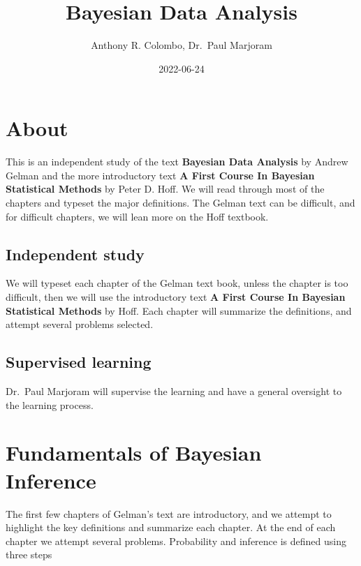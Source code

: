 \documentclass[
]{book}
\title{Bayesian Data Analysis}
\author{Anthony R. Colombo, Dr.~Paul Marjoram}
\date{2022-06-24}
\theoremstyle{definition}
\theoremstyle{definition}
\theoremstyle{definition}
\theoremstyle{definition}
\theoremstyle{remark}
\begin{document}
\maketitle

{
\setcounter{tocdepth}{1}
\tableofcontents
}
\hypertarget{about}{%
\chapter*{About}\label{about}}

This is an independent study of the text \textbf{Bayesian Data Analysis} by Andrew Gelman and the more introductory text \textbf{A First Course In Bayesian Statistical Methods} by Peter D. Hoff. We will read through most of the chapters and typeset the major definitions. The Gelman text can be difficult, and for difficult chapters, we will lean more on the Hoff textbook.

\hypertarget{independent-study}{%
\section*{Independent study}\label{independent-study}}

We will typeset each chapter of the Gelman text book, unless the chapter is too difficult, then we will use the introductory text \textbf{A First Course In Bayesian Statistical Methods} by Hoff. Each chapter will summarize the definitions, and attempt several problems selected.

\hypertarget{supervised-learning}{%
\section*{Supervised learning}\label{supervised-learning}}

Dr.~Paul Marjoram will supervise the learning and have a general oversight to the learning process.

\hypertarget{fundamentals-of-bayesian-inference}{%
\chapter{Fundamentals of Bayesian Inference}\label{fundamentals-of-bayesian-inference}}

The first few chapters of Gelman's text are introductory, and we attempt to highlight the key definitions and summarize each chapter. At the end of each chapter we attempt several problems. Probability and inference is defined using three steps
\end{document}
